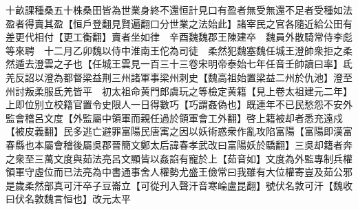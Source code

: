 十畝課種桑五十株桑田皆為世業身終不還恒計見口有盈者無受無還不足者受種如法盈者得賣其盈【恒戶登翻見賢遍翻口分世業之法始此】諸宰民之官各隨近給公田有差更代相付【更工衡翻】賣者坐如律　辛酉魏魏郡王陳建卒　魏員外散騎常侍李彪等來聘　十二月乙卯魏以侍中淮南王佗為司徒　柔然犯魏塞魏任城王澄帥衆拒之柔然遁去澄雲之子也【任城王雲見一百三十三卷宋明帝泰始七年任音壬帥讀曰率】氐羌反詔以澄為都督梁益荆三州諸軍事梁州刺史【魏高祖始置梁益二州於仇池】澄至州討叛柔服氐羌皆平　初太祖命黄門郎虞玩之等檢定黄籍【見上卷太祖建元二年】上即位别立校籍官置令史限人一日得數巧【巧謂姦偽也】既連年不已民愁怨不安外監會稽呂文度【外監屬中領軍而親任過於領軍會工外翻】啓上籍被却者悉充遠戍【被皮義翻】民多逃亡避罪富陽民唐㝢之因以妖術惑衆作亂攻陷富陽【富陽即漢富春縣也本屬會稽後屬吳郡晉簡文鄭太后諱春孝武改曰富陽妖於驕翻】三吳却籍者奔之衆至三萬文度與茹法亮呂文顯皆以姦諂有寵於上【茹音如】文度為外監專制兵權領軍守虛位而已法亮為中書通事舍人權勢尤盛王儉常曰我雖有大位權寄豈及茹公邪　是歲柔然部真可汗卒子豆崙立【可從刋入聲汗音寒崘盧昆翻】號伏名敦可汗【魏收曰伏名敦魏言恒也】改元太平

